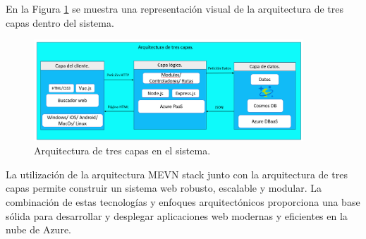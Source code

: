En la Figura \ref{fig:arquitectura-tres-capas} se muestra una representación visual de la arquitectura de tres capas dentro del sistema.

\begin{figure}[htbp]
\centering
\includegraphics[width=0.9\textwidth]{images/arqui/3capas.png}
\caption{Arquitectura de tres capas en el sistema.}
\label{fig:arquitectura-tres-capas}
\end{figure}

La utilización de la arquitectura MEVN stack junto con la arquitectura de tres capas permite construir un sistema web robusto, escalable y modular. La combinación de estas tecnologías y enfoques arquitectónicos proporciona una base sólida para desarrollar y desplegar aplicaciones web modernas y eficientes en la nube de Azure.